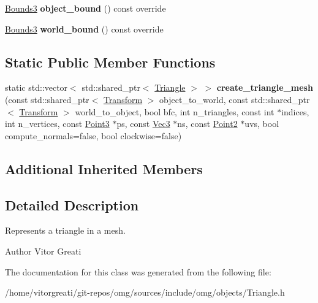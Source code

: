 \begin{DoxyCompactItemize}
\item 
\mbox{\label{classomg_1_1_triangle_af1d59610392f8a2a22d18d7ce3aa2084}} 
\mbox{\hyperlink{classomg_1_1_bounds3}{Bounds3}} {\bfseries object\+\_\+bound} () const override
\item 
\mbox{\label{classomg_1_1_triangle_a4fcdf7ff7dfca3b2f03c8585fc14ebad}} 
\mbox{\hyperlink{classomg_1_1_bounds3}{Bounds3}} {\bfseries world\+\_\+bound} () const override
\end{DoxyCompactItemize}
\subsection*{Static Public Member Functions}
\begin{DoxyCompactItemize}
\item 
\mbox{\label{classomg_1_1_triangle_a3b545f5e832f811bd15192e905e92bf3}} 
static std\+::vector$<$ std\+::shared\+\_\+ptr$<$ \mbox{\hyperlink{classomg_1_1_triangle}{Triangle}} $>$ $>$ {\bfseries create\+\_\+triangle\+\_\+mesh} (const std\+::shared\+\_\+ptr$<$ \mbox{\hyperlink{classomg_1_1_transform}{Transform}} $>$ object\+\_\+to\+\_\+world, const std\+::shared\+\_\+ptr$<$ \mbox{\hyperlink{classomg_1_1_transform}{Transform}} $>$ world\+\_\+to\+\_\+object, bool bfc, int n\+\_\+triangles, const int $\ast$indices, int n\+\_\+vertices, const \mbox{\hyperlink{namespaceomg_af85242d35fdacf829d32a6f9b95f3e35}{Point3}} $\ast$ps, const \mbox{\hyperlink{namespaceomg_a45a9482677fee9933ff369b49894e316}{Vec3}} $\ast$ns, const \mbox{\hyperlink{namespaceomg_a18e42fb7bbc4159e9137145b866ec578}{Point2}} $\ast$uvs, bool compute\+\_\+normals=false, bool clockwise=false)
\end{DoxyCompactItemize}
\subsection*{Additional Inherited Members}


\subsection{Detailed Description}
Represents a triangle in a mesh. 

\begin{DoxyAuthor}{Author}
Vitor Greati 
\end{DoxyAuthor}


The documentation for this class was generated from the following file\+:\begin{DoxyCompactItemize}
\item 
/home/vitorgreati/git-\/repos/omg/sources/include/omg/objects/Triangle.\+h\end{DoxyCompactItemize}
